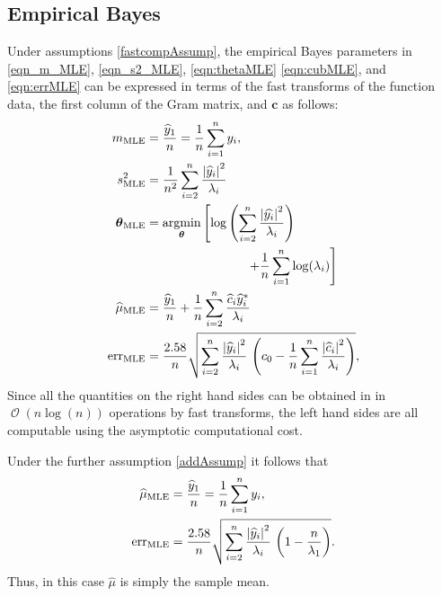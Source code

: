 \documentclass[twocolumn]{svjour3}          %
\DeclareMathOperator{\Order}{{\mathcal O}}
\newcommand{\bm}[1]{\boldsymbol{#1}}
\newcommand{\vtheta}{{\bm{\theta}}}
\newcommand{\vc}{\bm{c}}
\newcommand{\hmu}{\widehat{\mu}}
\newcommand{\MLE}{\text{MLE}}
\newcommand{\err}{\textup{err}}
\def\abs#1{\ensuremath{\left \lvert #1 \right \rvert}}
\providecommand{\argmin}{\operatorname*{argmin}}
\begin{document}
\subsection{Empirical Bayes}

Under assumptions \eqref{fastcompAssump}, the empirical Bayes parameters in \eqref{eqn_m_MLE}, \eqref{eqn_s2_MLE}, \eqref{eqn:thetaMLE} \eqref{eqn:cubMLE}, and \eqref{eqn:errMLE} can be expressed in terms of the fast transforms of the function data, the first column of the Gram matrix, and $\vc$ as follows:
\begin{align}
\nonumber
m_\MLE &=  \frac{\widehat{y}_1}{n} = \frac 1n \sum_{i=1}^n y_i,
\\
\nonumber
s^2_\MLE 
& =
\frac{1}{n^2} 
\sum_{i=2}^n \frac{\abs{\widehat{y}_i}^2}{\lambda_i} \\
\nonumber 
\vtheta_\MLE
&= 
\argmin_{\vtheta}
\left[
\log\left(
\sum_{i=2}^n \frac{\abs{\widehat{y_i}}^2}{\lambda_i}
\right) 
 \right . \\
&
\label{eqn_MLE_loss_func_optimized_2}
\qquad \qquad \qquad \qquad  \left . + 
\frac{1}{n}\sum_{i=1}^n \log(\lambda_i)
\right]
\\
\hmu_\MLE  &= 
\frac{\widehat{y}_1}{n} +
\frac 1n \sum_{i=2}^n \frac{ \widehat{c}_i \widehat{y}_i^*}{\lambda_i} \\
\err_\MLE  &
=
  \frac{2.58}{n}\sqrt{
 \sum_{i=2}^{n} \frac{\abs{\widehat{y}_i}^2}{\lambda_i}  
				\,
				\left( c_0 - \frac 1n \sum_{i=1}^n \frac{\abs{\widehat{c}_i}^2}{\lambda_i} \right) 
			},
\end{align}
Since all the quantities on the right hand sides can be obtained in in $\Order(n \log(n))$ operations by fast transforms, the left hand sides are all computable using the asymptotic computational cost.

Under the further assumption \eqref{addAssump} it follows that 
\begin{align}
\nonumber
\hmu_\MLE  &= 
\frac{\widehat{y}_1}{n} = \frac 1n \sum_{i=1}^n y_i,\\
\err_\MLE  &
=
\frac{2.58}{n}\sqrt{
	\sum_{i=2}^{n} \frac{\abs{\widehat{y}_i}^2}{\lambda_i}  
	\,
	\left( 1 -  \frac{n}{\lambda_1} \right) 
}.
\end{align}
Thus, in this  case $\hmu$ is simply the sample mean.
\end{document}
